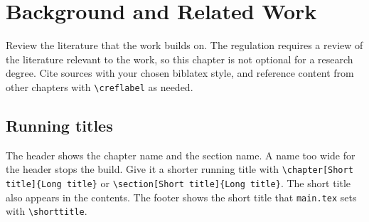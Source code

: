 \chapter{Background and Related Work}
Review the literature that the work builds on. The regulation requires a review of the literature relevant to the work, so this chapter is not optional for a research degree. Cite sources with your chosen biblatex style, and reference content from other chapters with \texttt{\textbackslash cref{label}} as needed.

\section{Running titles}
The header shows the chapter name and the section name. A name too wide for the header stops the build. Give it a shorter running title with \texttt{\textbackslash chapter[Short title]\{Long title\}} or \texttt{\textbackslash section[Short title]\{Long title\}}. The short title also appears in the contents. The footer shows the short title that \texttt{main.tex} sets with \texttt{\textbackslash shorttitle}.
